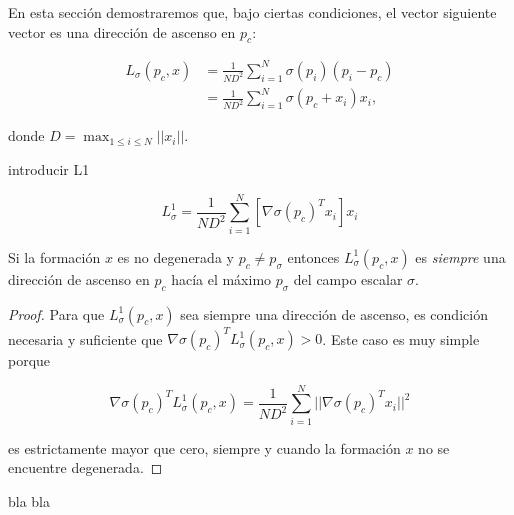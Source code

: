 En esta sección demostraremos que, bajo ciertas condiciones, el vector siguiente vector es una dirección de ascenso en $p_c$:

\begin{align}\label{eq: l_sigma}
    L_\sigma(p_c,x) &= \frac{1}{ND^2}\sum_{i=1}^N \sigma(p_i)(p_i - p_c) \nonumber \\
&= \frac{1}{ND^2}\sum_{i=1}^N \sigma(p_c + x_i)x_i,
\end{align}

donde $D = \operatorname{max}_{1\leq i\leq N}{||x_i||}$.

{\color{red} introducir L1}

\begin{equation} \label{eq: l1}
    L_\sigma^1 = \frac{1}{N D^2}\sum^{N}_{i=1} \left[ \nabla\sigma(p_c)^T x_i\right] x_i
\end{equation}

\begin{lemma}
\label{le: l1}
Si la formación $x$ es no degenerada y $p_c \ne p_\sigma$ entonces $L^1_\sigma(p_c,x)$ es \emph{siempre} una dirección de ascenso en $p_c$ hacía el máximo $p_\sigma$ del campo escalar $\sigma$.
\end{lemma}

\begin{proof}
Para que $L^1_\sigma(p_c,x)$ sea siempre una dirección de ascenso, es condición necesaria y suficiente que $\nabla\sigma(p_c)^TL^1_\sigma(p_c, x) > 0$. Este caso es muy simple porque

\begin{equation}
\nabla\sigma(p_c)^TL^1_\sigma(p_c, x) = \frac{1}{ND^2}\sum_{i=1}^N ||\nabla\sigma(p_c)^Tx_i||^2 \nonumber
\end{equation}

es estrictamente mayor que cero, siempre y cuando la formación $x$ no se encuentre degenerada.

\end{proof}

{\color{red} bla bla}